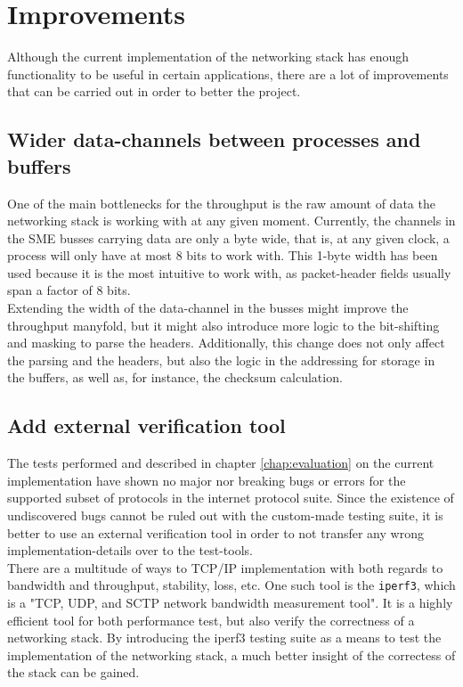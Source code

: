 \section{Improvements}
Although the current implementation of the networking stack has enough
functionality to be useful in certain applications, there are a lot of
improvements that can be carried out in order to better the project.


\subsection{Wider data-channels between processes and buffers}
One of the main bottlenecks for the throughput is the raw amount of data the
networking stack is working with at any given moment. Currently, the channels in
the SME busses carrying data are only a byte wide, that is, at any given clock,
a process will only have at most 8 bits to work with.
This 1-byte width has been used because it is the most intuitive to work with,
as packet-header fields usually span a factor of 8 bits.\\
Extending the width of the data-channel in the busses might improve the
throughput manyfold, but it might also introduce more logic to the bit-shifting
and masking to parse the headers. Additionally, this change does not only affect
the parsing and the headers, but also the logic in the addressing for storage
in the buffers, as well as, for instance, the checksum calculation.

\subsection{Add external verification tool}
The tests performed and described in chapter \ref{chap:evaluation} on the
current implementation have shown no major nor breaking bugs or errors for
the supported subset of protocols in the internet protocol suite.
Since the existence of undiscovered bugs cannot be ruled out with the
custom-made testing suite, it is better to use an external verification tool in
order to not transfer any wrong implementation-details over to the
test-tools.\\
There are a multitude of ways to TCP/IP implementation with both regards to
bandwidth and throughput, stability, loss, etc.
One such tool is the \texttt{iperf3}, which is a "TCP, UDP, and SCTP network
bandwidth measurement tool"\cite{iperf3}. It is a highly efficient tool for
both performance test, but also verify the correctness of a networking stack.
By introducing the iperf3 testing suite as a means to test the implementation of the networking
stack, a much better insight of the correctess of the stack can be gained.


